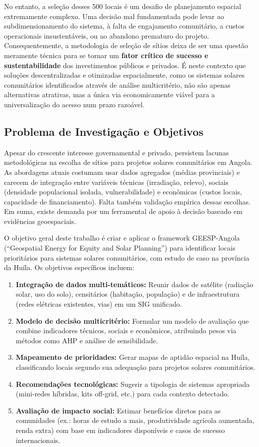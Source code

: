 \documentclass[12pt, a4paper]{article}
\begin{document}
No entanto, a seleção desses 500 locais é um desafio de planejamento espacial extremamente complexo. Uma decisão mal fundamentada pode levar ao subdimensionamento do sistema, à falta de engajamento comunitário, a custos operacionais insustentáveis, ou ao abandono prematuro do projeto. Consequentemente, a metodologia de seleção de sítios deixa de ser uma questão meramente técnica para se tornar um \textbf{fator crítico de sucesso e sustentabilidade} dos investimentos públicos e privados. É neste contexto que soluções descentralizadas e otimizadas espacialmente, como os sistemas solares comunitários identificados através de análise multicritério, não são apenas alternativas atrativas, mas a única via economicamente viável para a universalização do acesso num prazo razoável.

\subsection{Problema de Investigação e Objetivos}

Apesar do crescente interesse governamental e privado, persistem lacunas metodológicas na escolha de sítios para projetos solares comunitários em Angola. As abordagens atuais costumam usar dados agregados (médias provinciais) e carecem de integração entre variáveis técnicas (irradiação, relevo), sociais (densidade populacional isolada, vulnerabilidade) e econômicas (custos locais, capacidade de financiamento). Falta também validação empírica dessas escolhas. Em suma, existe demanda por um ferramental de apoio à decisão baseado em evidências geoespaciais.

O objetivo geral deste trabalho é criar e aplicar o framework GEESP-Angola (``Geospatial Energy for Equity and Solar Planning'') para identificar locais prioritários para sistemas solares comunitários, com estudo de caso na província da Huíla. Os objetivos específicos incluem:

\begin{enumerate}
\item \textbf{Integração de dados multi-temáticos:} Reunir dados de satélite (radiação solar, uso do solo), censitários (habitação, população) e de infraestrutura (redes elétricas existentes, vias) em um SIG unificado.
\item \textbf{Modelo de decisão multicritério:} Formular um modelo de avaliação que combine indicadores técnicos, sociais e econômicos, atribuindo pesos via métodos como AHP e análise de sensibilidade.
\item \textbf{Mapeamento de prioridades:} Gerar mapas de aptidão espacial na Huíla, classificando locais segundo sua adequação para projetos solares comunitários.
\item \textbf{Recomendações tecnológicas:} Sugerir a tipologia de sistemas apropriada (mini-redes híbridas, kits off-grid, etc.) para cada contexto detectado.
\item \textbf{Avaliação de impacto social:} Estimar benefícios diretos para as comunidades (ex.: horas de estudo a mais, produtividade agrícola aumentada, renda extra) com base em indicadores disponíveis e casos de sucesso internacionais.
\end{enumerate}
\end{document}
